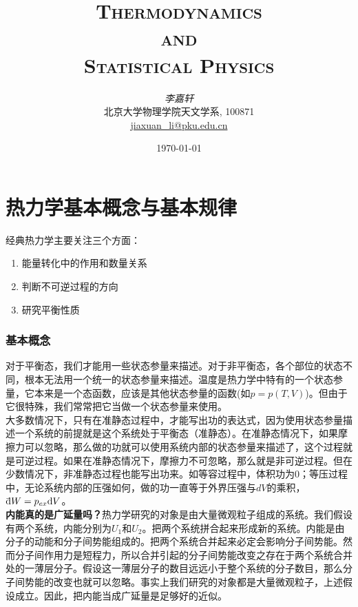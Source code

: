 \documentclass[UTF8]{ctexart}
\newcommand{\erhao}{\fontsize{18pt}{\baselineskip}\selectfont} %
\newcommand{\dbar}{\mathrm{\mathchar'26\mkern-9mu d}}
\newcommand{\md}{\mathrm{d}}
\numberwithin{equation}{subsection}
\begin{document}
\thispagestyle{empty} %
\clearpage
\setlength{\parskip}{0.7ex plus0.3ex minus0.3ex} %
\setcounter{page}{1} %
\headheight 20pt %
\pagestyle{fancy}
\lhead{\usebox{\headpic}}
\title{\Huge\scshape Thermodynamics\\
	\LARGE{and}\\
	\Huge Statistical Physics}
\author
{\emph{\erhao 李嘉轩}\\
	\normalsize{北京大学物理学院天文学系, 100871}\\
	\href{Email: jiaxuan\_li@pku.edu.cn}{jiaxuan\_li@pku.edu.cn}}
\date{\today}
\maketitle

\part{热力学基本概念与基本规律}
经典热力学主要关注三个方面：
\begin{enumerate}
	\item 能量转化中的作用和数量关系
	\item 判断不可逆过程的方向
	\item 研究平衡性质
\end{enumerate}
\section{基本概念}
对于平衡态，我们才能用一些状态参量来描述。对于非平衡态，各个部位的状态不同，根本无法用一个统一的状态参量来描述。温度是热力学中特有的一个状态参量，它本来是一个态函数，应该是其他状态参量的函数(如$p=p(T,V)$)。但由于它很特殊，我们常常把它当做一个状态参量来使用。\\

大多数情况下，只有在准静态过程中，才能写出功的表达式，因为使用状态参量描述一个系统的前提就是这个系统处于平衡态（准静态）。在准静态情况下，如果摩擦力可以忽略，那么做的功就可以使用系统内部的状态参量来描述了，这个过程就是可逆过程。如果在准静态情况下，摩擦力不可忽略，那么就是非可逆过程。但在少数情况下，非准静态过程也能写出功来。如等容过程中，体积功为0；等压过程中，无论系统内部的压强如何，做的功一直等于外界压强与$dV$的乘积，${\dbar} W=p_{ex}\md V$。\\

\textbf{内能真的是广延量吗？}热力学研究的对象是由大量微观粒子组成的系统。我们假设有两个系统，内能分别为$U_1$和$U_2$。把两个系统拼合起来形成新的系统。内能是由分子的动能和分子间势能组成的。把两个系统合并起来必定会影响分子间势能。然而分子间作用力是短程力，所以合并引起的分子间势能改变之存在于两个系统合并处的一薄层分子。假设这一薄层分子的数目远远小于整个系统的分子数目，那么分子间势能的改变也就可以忽略。事实上我们研究的对象都是大量微观粒子，上述假设成立。因此，把内能当成广延量是足够好的近似。\\
\end{document}

